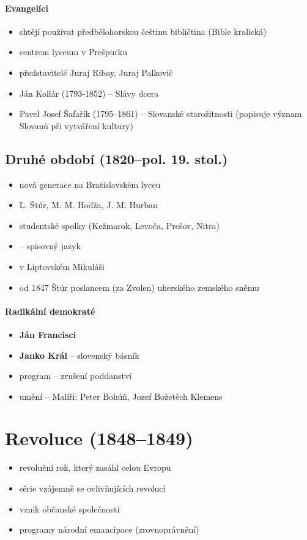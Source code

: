 \paragraph{Evangelíci}
\begin{itemize}
\item chtějí používat předbělohorskou češtinu \ra bibličtina (Bible kralická)
\item centrem lyceum v Prešpurku
\item představitelé Juraj Ribay, Juraj Palkovič
\item Ján Kollár (1793-1852) -- Slávy dcera
\item Pavel Josef Šafařík  (1795--1861) -- Slovanské starožitnosti (popisuje význam Slovanů při vytváření kultury)
\end{itemize}

\subsection{Druhé období (1820--pol. 19. stol.)}
\begin{itemize}
\item nová generace na Bratislavském lyceu
\item L. Štúr, M. M. Hodža, J. M. Hurban
\item studentské spolky (Kežmarok, Levoča, Prešov, Nitra)
\item {} -- spisovný jazyk
\item {} v Liptovském Mikuláši
\item od 1847 Štúr poslancem (za Zvolen) uherského zemského sněmu
\end{itemize}

\paragraph{Radikální demokraté}
\begin{itemize}
\item \textbf{Ján Francisci}
\item \textbf{Janko Král} -- slovenský básník
\item program -- zrušení poddanství
\item umění -- Malíři: Peter Bohúň, Jozef Božetěch Klemens
\end{itemize}

\section{Revoluce (1848--1849)}
\begin{itemize}
\item revoluční rok, který zasáhl celou Evropu
\item série vzájemně se ovlivňujících revolucí
\item vznik občanské společnosti
\item programy národní emancipace (zrovnoprávnění)
\end{itemize}

